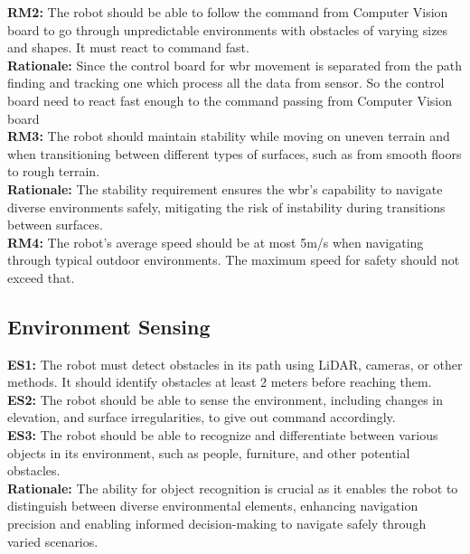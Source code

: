 \documentclass[12pt]{article}
\begin{document}
\noindent\textbf{RM2:} The robot should be able to follow the command from Computer Vision board to go through unpredictable environments with obstacles of varying sizes and shapes. It must react to command fast. \\
\noindent\textbf{Rationale:} Since the control board for \acrshort{wbr} movement is separated from the path finding and tracking one which process all the data from sensor. So the control board need to react fast enough to the command passing from Computer Vision board \\

\noindent\textbf{RM3:} The robot should maintain stability while moving on uneven terrain and when transitioning between different types of surfaces, such as from smooth floors to rough terrain.\\
\noindent\textbf{Rationale:} The stability requirement ensures the \acrshort{wbr}'s capability to navigate diverse environments safely, mitigating the risk of instability during transitions between surfaces.\\

\noindent\textbf{RM4:} The robot's average speed should be at most 5m/s when navigating through typical outdoor environments. The maximum speed for safety should not exceed that.\\


\subsection{Environment Sensing}
\noindent\textbf{ES1:} The robot must detect obstacles in its path using LiDAR, cameras, or other methods. It should identify obstacles at least 2 meters before reaching them.\\

\noindent\textbf{ES2:} The robot should be able to sense the environment, including changes in elevation, and surface irregularities, to give out command accordingly.\\

\noindent\textbf{ES3:} The robot should be able to recognize and differentiate between various objects in its environment, such as people, furniture, and other potential obstacles.\\
\noindent\textbf{Rationale:} The ability for object recognition is crucial as it enables the robot to distinguish between diverse environmental elements, enhancing navigation precision and enabling informed decision-making to navigate safely through varied scenarios.\\
\end{document}
